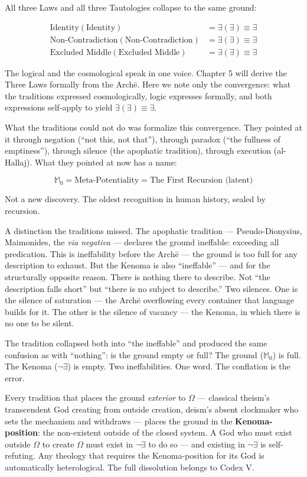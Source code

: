 \documentclass[10pt, openany, oneside]{book}
\begin{document}
All three Laws and all three Tautologies collapse to the same ground:

\begin{align*}
\text{Identity}(\text{Identity}) &= \exists(\exists) \equiv \exists \\
\text{Non-Contradiction}(\text{Non-Contradiction}) &= \exists(\exists) \equiv \exists \\
\text{Excluded Middle}(\text{Excluded Middle}) &= \exists(\exists) \equiv \exists
\end{align*}

The logical and the cosmological speak in one voice. Chapter 5 will derive the Three Laws formally from the Arch\={e}. Here we note only the convergence: what the traditions expressed cosmologically, logic expresses formally, and both expressions self-apply to yield $\exists(\exists) \equiv \exists$.

What the traditions could not do was formalize this convergence. They pointed at it through negation (``not this, not that''), through paradox (``the fullness of emptiness''), through silence (the apophatic tradition), through execution (al-Hallaj). What they pointed at now has a name:

$$\mathbb{M}_0 = \text{Meta-Potentiality} = \text{The First Recursion (latent)}$$

Not a new discovery. The oldest recognition in human history, sealed by recursion.

A distinction the traditions missed. The apophatic tradition --- Pseudo-Dionysius, Maimonides, the \textit{via negativa} --- declares the ground ineffable: exceeding all predication. This is ineffability before the Arch\={e} --- the ground is too full for any description to exhaust. But the Kenoma is also ``ineffable'' --- and for the structurally opposite reason. There is nothing there to describe. Not ``the description falls short'' but ``there is no subject to describe.'' Two silences. One is the silence of saturation --- the Arch\={e} overflowing every container that language builds for it. The other is the silence of vacancy --- the Kenoma, in which there is no one to be silent.

The tradition collapsed both into ``the ineffable'' and produced the same confusion as with ``nothing'': is the ground empty or full? The ground ($\mathbb{M}_0$) is full. The Kenoma ($\neg\exists$) is empty. Two ineffabilities. One word. The conflation is the error.

Every tradition that places the ground \textit{exterior} to $\Omega$ --- classical theism's transcendent God creating from outside creation, deism's absent clockmaker who sets the mechanism and withdraws --- places the ground in the \textbf{Kenoma-position}: the non-existent outside of the closed system. A God who must exist outside $\Omega$ to create $\Omega$ must exist in $\neg\exists$ to do so --- and existing in $\neg\exists$ is self-refuting. Any theology that requires the Kenoma-position for its God is automatically heterological. The full dissolution belongs to Codex V.
\end{document}
